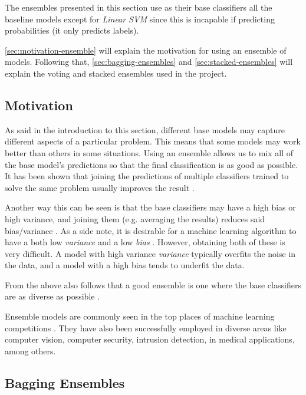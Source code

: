 \documentclass[epsfig,a4paper,11pt,titlepage,twoside,openany]{book}
\begin{document}
The ensembles presented in this section use as their base classifiers all the baseline models except for \textit{Linear SVM} since this is incapable if predicting probabilities (it only predicts labels). 

\autoref{sec:motivation-ensemble} will explain the motivation for using an ensemble of models. Following that, \autoref{sec:bagging-ensembles} and \autoref{sec:stacked-ensembles} will explain the voting and stacked ensembles used in the project.


\subsection{Motivation} 
\label{sec:motivation-ensemble}

As said in the introduction to this section, different base models may capture different aspects of a particular problem. This means that some models may work better than others in some situations. Using an ensemble allows us to mix all of the base model's predictions so that the final classification is as good as possible. It has been shown that joining the predictions of multiple classifiers trained to solve the same problem usually improves the result \cite{opitz1999popular,Hansen1990,Schapire1990}.

Another way this can be seen is that the base classifiers may have a high bias or high variance, and joining them (e.g. averaging the results) reduces said bias/variance \cite{Breiman1996_bagging_predictors}. As a side note, it is desirable for a machine learning algorithm to have a both low \textit{variance} and a low \textit{bias} \cite{Munro2011_bias_variance_decomp}. However, obtaining both of these is very difficult. A model with high variance \textit{variance} typically overfits the noise in the data, and a model with a high bias tends to underfit the data. 

From the above also follows that a good ensemble is one where the base classifiers are as diverse as possible \cite{zhou2012ensemble}. 

Ensemble models are commonly seen in the top places of machine learning competitions \cite{Bell:2007_netflix_competition}. They have also been successfully employed in diverse areas \cite{zhou2012ensemble} like computer vision, computer security, intrusion detection, in medical applications, among others.


\subsection{Bagging Ensembles}
\label{sec:bagging-ensembles}
\end{document}
